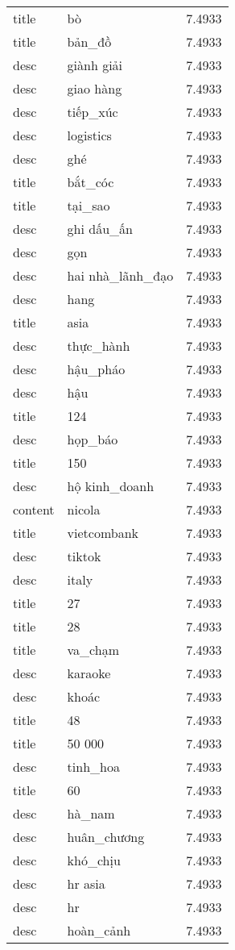 \documentclass{article}
\begin{document}
\begin{tabular}{lll}
title & bò & 7.4933\\
title & bản\_đồ & 7.4933\\
desc & giành giải & 7.4933\\
desc & giao hàng & 7.4933\\
desc & tiếp\_xúc & 7.4933\\
desc & logistics & 7.4933\\
desc & ghé & 7.4933\\
title & bắt\_cóc & 7.4933\\
title & tại\_sao & 7.4933\\
desc & ghi dấu\_ấn & 7.4933\\
desc & gọn & 7.4933\\
desc & hai nhà\_lãnh\_đạo & 7.4933\\
desc & hang & 7.4933\\
title & asia & 7.4933\\
desc & thực\_hành & 7.4933\\
desc & hậu\_pháo & 7.4933\\
desc & hậu & 7.4933\\
title & 124 & 7.4933\\
desc & họp\_báo & 7.4933\\
title & 150 & 7.4933\\
desc & hộ kinh\_doanh & 7.4933\\
content & nicola & 7.4933\\
title & vietcombank & 7.4933\\
desc & tiktok & 7.4933\\
desc & italy & 7.4933\\
title & 27 & 7.4933\\
title & 28 & 7.4933\\
title & va\_chạm & 7.4933\\
desc & karaoke & 7.4933\\
desc & khoác & 7.4933\\
title & 48 & 7.4933\\
title & 50 000 & 7.4933\\
desc & tinh\_hoa & 7.4933\\
title & 60 & 7.4933\\
desc & hà\_nam & 7.4933\\
desc & huân\_chương & 7.4933\\
desc & khó\_chịu & 7.4933\\
desc & hr asia & 7.4933\\
desc & hr & 7.4933\\
desc & hoàn\_cảnh & 7.4933\\

\end{tabular}
\end{document}
